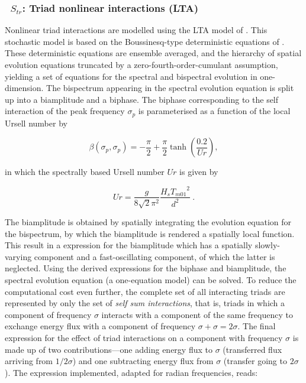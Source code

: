 \vsssub
\subsubsection{~$S_{tr}$: Triad nonlinear interactions (LTA)} \label{sec:TR1}
\vsssub


Nonlinear triad interactions are modelled using the LTA model of 
\cite{rep:Eld96}. This stochastic model is based on the 
Boussinesq-type deterministic equations of \cite{art:MS93}. 
These deterministic equations are ensemble averaged, and the hierarchy 
of spatial evolution equations truncated by a zero-fourth-order-cumulant 
assumption, yielding a set of equations for the spectral and bispectral 
evolution in one-dimension. The bispectrum appearing in the spectral 
evolution equation is split up into a biamplitude and a biphase. The 
biphase corresponding to the self interaction of the peak frequency 
$\sigma_p$ is parameterised as a function of the local Ursell number by

\begin{equation}
   \beta(\sigma_p,\sigma_p) = -\frac{\pi}{2} + \frac{\pi}{2}\tanh\left( \frac{0.2}{Ur} \right),
   \label{eq:biphase}
\end{equation}

\noindent
in which the spectrally based Ursell number $Ur$ is given by

\begin{equation}
   Ur = \frac{g}{8\sqrt{2} \pi^2} \frac{H_s {T_{m01}}^2}{d^2}\  .
   \label{eq:ursell}
\end{equation}


The biamplitude is obtained by spatially integrating the evolution equation
for the bispectrum, by which the biamplitude is rendered a spatially local
function. This result in a expression for the biamplitude which has a
spatially slowly-varying component and a fast-oscillating component, of which
the latter is neglected. Using the derived expressions for the biphase and
biamplitude, the spectral evolution equation (a one-equation model) can be
solved. To reduce the computational cost even further, the complete set of all
interacting triads are represented by only the set of \textit{self sum
  interactions}, that is, triads in which a component of frequency $\sigma$
interacts with a component of the same frequency to exchange energy flux with
a component of frequency $\sigma + \sigma = 2\sigma$. The final expression for
the effect of triad interactions on a component with frequency $\sigma$ is
made up of two contributions---one adding energy flux to $\sigma$ (transferred
flux arriving from $1/2 \sigma$) and one subtracting energy flux from $\sigma$
(transfer going to $2 \sigma$). The expression implemented, adapted for radian
frequencies, reads:

